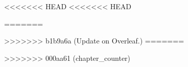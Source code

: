 

% 
% 
\setcounter{chapter}{1}
<<<<<<< HEAD
<<<<<<< HEAD

% 
% 
% 
% 
=======


>>>>>>> b1b9a6a (Update on Overleaf.)
=======

% 
% 
>>>>>>> 000aa61 (chapter_counter)
% 
% 

